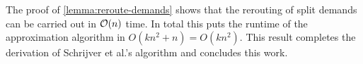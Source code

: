 The proof of \cref{lemma:reroute-demands} shows that the rerouting of split demands can be carried out in $\mathcal{O}(n)$ time.
In total this puts the runtime of the approximation algorithm in $O(k n^2 + n) = O(k n^2)$. 
This result completes the derivation of Schrijver et al.'s \RL algorithm and concludes this work.
